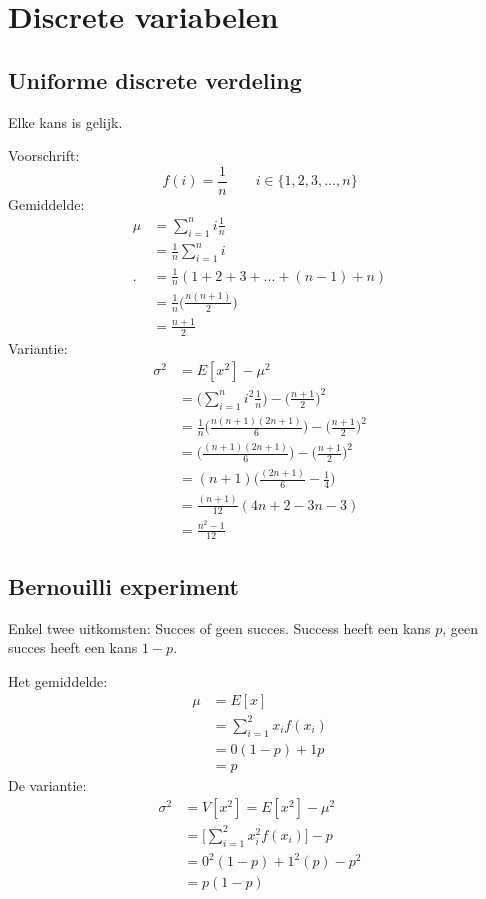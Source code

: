 \documentclass[12pt]{report}
\begin{document}
\chapter{Discrete variabelen}
\section{Uniforme discrete verdeling}
Elke kans is gelijk.

Voorschrift:
$$f(i) = \frac{1}{n} \qquad i \in \{1, 2, 3, ..., n\}$$
Gemiddelde:
\begin{equation*}
 \begin{split}
  \mu & = \sum_{i = 1}^{n}i \frac{1}{n} \\
      & =  \frac{1}{n} \sum_{i = 1}^{n}i\\.
      & =  \frac{1}{n}(1 + 2 + 3 + ... + (n - 1) + n)\\
      & =  \frac{1}{n}\bigg(\frac{n(n + 1)}{2}\bigg)\\ 
      & = \frac{n + 1}{2}
 \end{split}
\end{equation*}
Variantie:
\begin{equation*}
 \begin{split}
  \sigma^2 & = E[x^2] - \mu^2 \\
           & = \bigg(\sum_{i = 1}^{n}i^2 \frac{1}{n}\bigg) - \bigg(\frac{n + 1}{2}\bigg)^2 \\
           & = \frac{1}{n}\bigg(\frac{n(n+1)(2n+1)}{6}\bigg) - \bigg(\frac{n + 1}{2}\bigg)^2 \\
           & = \bigg(\frac{(n+1)(2n+1)}{6}\bigg) - \bigg(\frac{n + 1}{2}\bigg)^2 \\
           & = (n + 1)\bigg(\frac{(2n+1)}{6} - \frac{1}{4}\bigg) \\
           & = \frac{(n + 1)}{12}(4n + 2 - 3n - 3) \\
           & = \frac{n^2 - 1}{12}
 \end{split}
\end{equation*}
\section{Bernouilli experiment}
Enkel twee uitkomsten: Succes of geen succes. Success heeft een kans $p$, geen succes heeft een kans $ 1 - p$.

Het gemiddelde:
\begin{equation*}
 \begin{split}
  \mu & = E[x] \\
      & = \sum_{i = 1}^{2}x_if(x_i) \\
      & = 0(1 - p) + 1p \\
      & = p
 \end{split}
\end{equation*}
De variantie:
\begin{equation*}
 \begin{split}
  \sigma^2 & = V[x^2] = E[x^2] - \mu^2 \\
           & = \bigg[\sum_{i = 1}^{2}x_i^2f(x_i)\bigg] - p \\
           & = 0^2(1 - p) + 1^2(p) - p^2 \\
           & = p(1 - p)
 \end{split}
\end{equation*}
\end{document}
